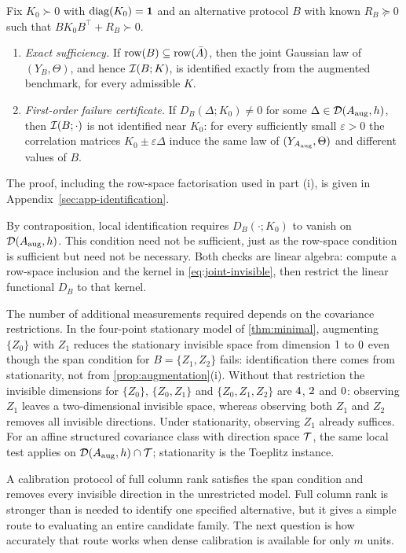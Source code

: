 \begin{proposition}
\label{prop:augmentation}
Fix $K_0\succ0$ with $\operatorname{diag}(K_0)=\mathbf{1}$ and an alternative protocol $B$ with
known $R_B\succeq0$ such that $BK_0B^\top+R_B\succ0$.
\begin{enumerate}[label=(\roman*),leftmargin=2.2em,itemsep=2pt]
\item \emph{Exact sufficiency.} If $\operatorname{row}(B)\subseteq\operatorname{row}(\bar A)$,
then the joint Gaussian law of $(Y_B,\Theta)$, and hence $\mathcal{I}(B;K)$, is
identified exactly from the augmented benchmark, for every admissible $K$.
\item \emph{First-order failure certificate.} If $D_B(\Delta;K_0)\neq0$ for
some $\Delta\in\mathcal{D}(A_{\rm aug},h)$, then $\mathcal{I}(B;\cdot)$ is not identified near
$K_0$: for every sufficiently small $\varepsilon>0$ the correlation matrices
$K_0\pm\varepsilon\Delta$ induce the same law of $(Y_{A_{\rm aug}},\Theta)$ and
different values of $B$.
\end{enumerate}
\end{proposition}

The proof, including the row-space factorisation used in part (i), is given in
Appendix~\ref{sec:app-identification}.

By contraposition, local identification requires $D_B(\cdot;K_0)$ to vanish on
$\mathcal{D}(A_{\rm aug},h)$. This condition need not be sufficient, just as the
row-space condition is sufficient but need not be necessary. Both checks are
linear algebra: compute a row-space inclusion and the kernel in
\eqref{eq:joint-invisible}, then restrict the linear functional $D_B$ to that
kernel.

The number of additional measurements required depends on the covariance
restrictions. In the four-point
stationary model of \cref{thm:minimal}, augmenting $\{Z_0\}$ with $Z_1$ reduces
the stationary invisible space from dimension $1$ to
$0$ even though the span condition for $B=\{Z_1,Z_2\}$ fails:
identification there comes from stationarity, not from
\cref{prop:augmentation}(i). Without that restriction the invisible dimensions
for $\{Z_0\}$, $\{Z_0,Z_1\}$ and $\{Z_0,Z_1,Z_2\}$ are $4$,
$2$ and $0$: observing $Z_1$ leaves a two-dimensional
invisible space, whereas observing both $Z_1$ and $Z_2$ removes all invisible
directions. Under stationarity, observing $Z_1$ already suffices. For an affine
structured covariance class with direction space $\mathcal{T}$, the same local test
applies on $\mathcal{D}(A_{\rm aug},h)\cap\mathcal{T}$; stationarity is the Toeplitz instance.

A calibration protocol of full column rank satisfies the span condition and
removes every invisible direction in the unrestricted model. Full column rank
is stronger than is needed to identify one specified alternative, but it gives
a simple route to evaluating an entire candidate family. The next question is
how accurately that route works when dense calibration is available for only
$m$ units.
